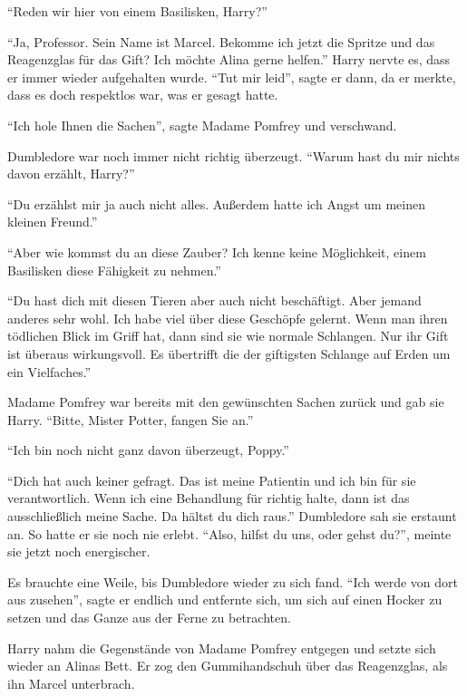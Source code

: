 \enquote{Reden wir hier von einem Basilisken, Harry?}

\enquote{Ja, Professor. Sein Name ist Marcel. \gst Bekomme ich jetzt die Spritze und das Reagenzglas für das Gift? Ich möchte Alina gerne helfen.} Harry nervte es, dass er immer wieder aufgehalten wurde. \enquote{Tut mir leid}, sagte er dann, da er merkte, dass es doch respektlos war, was er gesagt hatte.

\enquote{Ich hole Ihnen die Sachen}, sagte Madame Pomfrey und verschwand.

Dumbledore war noch immer nicht richtig überzeugt. \enquote{Warum hast du mir nichts davon erzählt, Harry?}

\enquote{Du erzählst mir ja auch nicht alles. Außerdem hatte ich Angst um meinen kleinen Freund.}

\enquote{Aber wie kommst du an diese Zauber? Ich kenne keine Möglichkeit, einem Basilisken diese Fähigkeit zu nehmen.}

\enquote{Du hast dich mit diesen Tieren aber auch nicht beschäftigt. Aber jemand anderes sehr wohl. Ich habe viel über diese Geschöpfe gelernt. Wenn man ihren tödlichen Blick im Griff hat, dann sind sie wie normale Schlangen. Nur ihr Gift ist überaus wirkungsvoll. Es übertrifft die der giftigsten Schlange auf Erden um ein Vielfaches.}

Madame Pomfrey war bereits mit den gewünschten Sachen zurück und gab sie Harry. \enquote{Bitte, Mister Potter, fangen Sie an.}

\enquote{Ich bin noch nicht ganz davon überzeugt, Poppy.}

\enquote{Dich hat auch keiner gefragt. Das ist meine Patientin und ich bin für sie verantwortlich. Wenn ich eine Behandlung für richtig halte, dann ist das ausschließlich meine Sache. Da hältst du dich raus.} Dumbledore sah sie erstaunt an. So hatte er sie noch nie erlebt. \enquote{Also, hilfst du uns, oder gehst du?}, meinte sie jetzt noch energischer.

Es brauchte eine Weile, bis Dumbledore wieder zu sich fand. \enquote{Ich werde von dort aus zusehen}, sagte er endlich und entfernte sich, um sich auf einen Hocker zu setzen und das Ganze aus der Ferne zu betrachten.

Harry nahm die Gegenstände von Madame Pomfrey entgegen und setzte sich wieder an Alinas Bett. Er zog den Gummihandschuh über das Reagenzglas, als ihn Marcel unterbrach.


